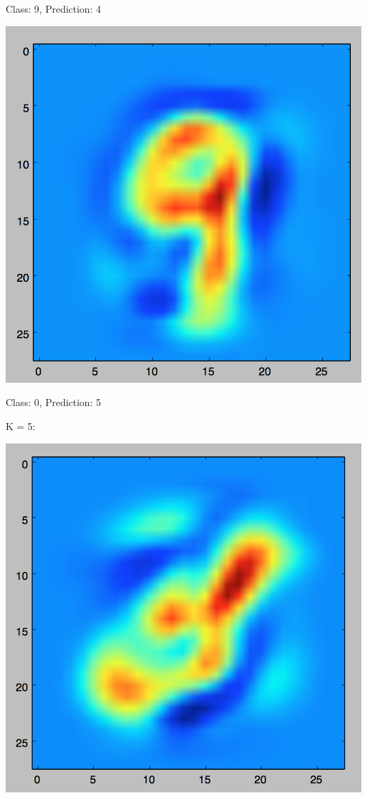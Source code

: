 \documentclass[11pt]{article}
\begin{document}
Class: 9, Prediction: 4

\includegraphics[scale=.3]{images/knn3_9_4.png}

Class: 0, Prediction: 5

K = 5:

\includegraphics[scale=.3]{images/knn5_0_5.png}
\end{document}
